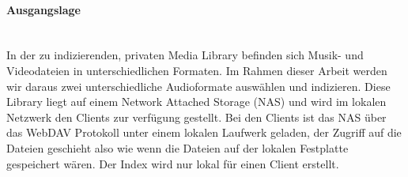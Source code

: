 \paragraph{Ausgangslage} \hfill \\
In der zu indizierenden, privaten Media Library befinden sich
Musik- und Videodateien in unterschiedlichen Formaten.
Im Rahmen dieser Arbeit werden wir daraus zwei unterschiedliche
Audioformate auswählen und indizieren.
Diese Library liegt auf einem Network Attached Storage (NAS)
und wird im lokalen Netzwerk den Clients zur verfügung
gestellt. Bei den Clients ist das NAS über das WebDAV
Protokoll unter einem lokalen Laufwerk geladen, der Zugriff
auf die Dateien geschieht also wie wenn die Dateien auf
der lokalen Festplatte gespeichert wären. Der Index wird nur
lokal für einen Client erstellt.
